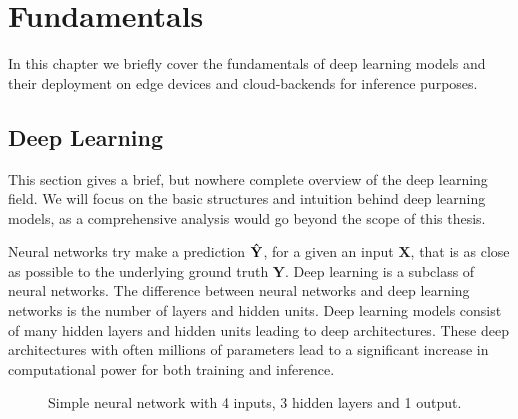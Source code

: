 \chapter{Fundamentals}
\label{chap:fundamentels}
In this chapter we briefly cover the fundamentals of deep learning models and their deployment on edge devices and cloud-backends for inference purposes.



\section{Deep Learning}
This section gives a brief, but nowhere complete overview of the deep learning field. We will focus on the basic structures and intuition behind deep learning models, as a comprehensive analysis would go beyond the scope of this thesis.

Neural networks try make a prediction $\mathbf{\Hat{Y}}$, for a  given an input $\mathbf{X}$, that is as close as possible to the underlying ground truth $\mathbf{Y}$. 
Deep learning is a subclass of neural networks.
The difference between neural networks and deep learning networks is the number of layers and hidden units. Deep learning models consist of many hidden layers and hidden units leading to deep architectures.
These deep architectures with often millions of parameters lead to a significant increase in computational power for both training and inference.
\begin{figure}[!htb]
    \centering
    \resizebox{.8\linewidth}{!}{}
    \caption{Simple neural network with 4 inputs, 3 hidden layers and 1 output.}
    \label{fig:simpleNN}
\end{figure}


